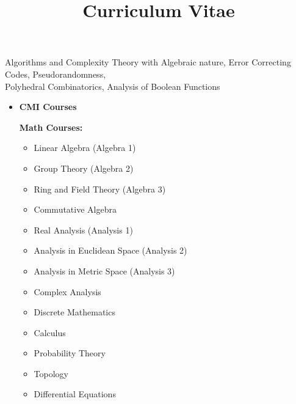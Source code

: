 \documentclass[a4paper,skipsamekey,11pt,english]{curve}
\title{Curriculum Vitae}
\begin{document}
\makeheaders[c]

Algorithms and Complexity Theory with Algebraic nature, Error Correcting Codes, Pseudorandomness, \\
Polyhedral Combinatorics, Analysis of Boolean Functions

% 
\begin{itemize}
	\item \textbf{CMI Courses}

	      \begin{multicols}{2}
		      \textbf{Math Courses:}{}
		      \begin{itemize}
			      \item Linear Algebra (Algebra 1)
			      \item Group Theory (Algebra 2)
			      \item Ring and  Field Theory (Algebra 3)
			      \item Commutative Algebra
			      \item Real Analysis (Analysis 1)
			      \item Analysis in Euclidean Space (Analysis 2)
			      \item Analysis in Metric Space (Analysis 3)
			      \item Complex Analysis
			      \item Discrete Mathematics
			      \item Calculus
			      \item Probability Theory
			      \item Topology
			      \item Differential Equations
		      \end{itemize}
		      \columnbreak


\end{multicols}
\end{itemize}
\end{document}
